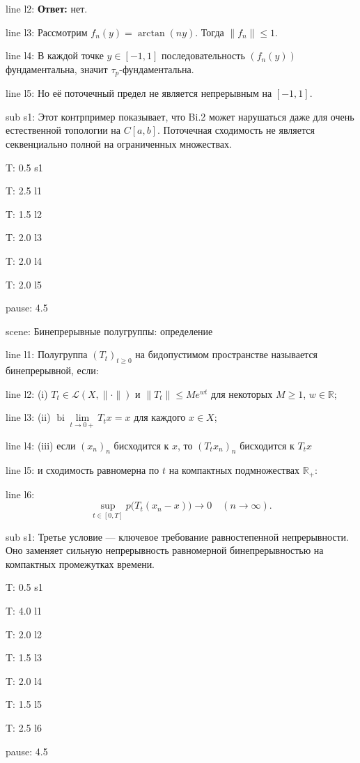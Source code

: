 \documentclass[a4paper,11pt]{article}
\newcommand{\R}{\mathbb{R}}
\begin{document}
line l2: {\textbf{Ответ:} нет.}

line l3: {Рассмотрим $f_n(y)=\arctan(ny)$. Тогда $\|f_n\|\le 1$.}

line l4: {В каждой точке $y\in[-1,1]$ последовательность $(f_n(y))$ фундаментальна, значит $\tau_p$-фундаментальна.}

line l5: {Но её поточечный предел не является непрерывным на $[-1,1]$.}


sub s1: {Этот контрпример показывает, что Bi.2 может нарушаться даже для очень естественной топологии на $C[a,b]$. Поточечная сходимость не является секвенциально полной на ограниченных множествах.}


T: 0.5 s1

T: 2.5 l1

T: 1.5 l2

T: 2.0 l3

T: 2.0 l4

T: 2.0 l5

pause: 4.5



scene: {Бинепрерывные полугруппы: определение}

line l1: {Полугруппа $(T_t)_{t\ge0}$ на бидопустимом пространстве называется бинепрерывной, если:}

line l2: {(i) $T_t\in\mathcal{L}(X,\|\cdot\|)$ и $\|T_t\|\le Me^{wt}$ для некоторых $M\ge1$, $w\in\R$;}

line l3: {(ii) $\operatorname{bi}\lim\limits_{t\to0+}T_t x=x$ для каждого $x\in X$;}

line l4: {(iii) если $(x_n)_n$ бисходится к $x$, то $(T_t x_n)_n$ бисходится к $T_t x$}

line l5: {и сходимость равномерна по $t$ на компактных подмножествах $\R_+$:}

line l6: {$$\sup\limits_{t\in[0,T]}p\bigl(T_t(x_n-x)\bigr)\to0\quad(n\to\infty).$$}


sub s1: {Третье условие --- ключевое требование равностепенной непрерывности. Оно заменяет сильную непрерывность равномерной бинепрерывностью на компактных промежутках времени.}


T: 0.5 s1

T: 4.0 l1

T: 2.0 l2

T: 1.5 l3

T: 2.0 l4

T: 1.5 l5

T: 2.5 l6

pause: 4.5
\end{document}
